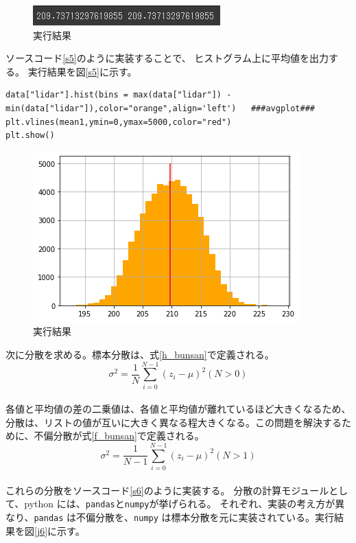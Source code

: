 \begin{figure}[htbp]
  \begin{center}
  \includegraphics[width=.5\linewidth]{img/4.png}
  \caption{実行結果}
  \label{j4}
  \end{center}
\end{figure}

ソースコード\ref{s5}\cite{robo}のように実装することで、
ヒストグラム上に平均値を出力する。
実行結果を図\ref{s5}に示す。
\begin{lstlisting}[caption=平均値の出力,label=s5]
data["lidar"].hist(bins = max(data["lidar"]) - min(data["lidar"]),color="orange",align='left')   ###avgplot###
plt.vlines(mean1,ymin=0,ymax=5000,color="red")
plt.show()
\end{lstlisting}

\begin{figure}[htbp]
  \begin{center}
  \includegraphics[width=.7\linewidth]{img/5.png}
  \caption{実行結果}
  \label{j5}
  \end{center}
\end{figure}

次に分散を求める。標本分散は、式\eqref{h_bunsan}で定義される。
\begin{equation}
  \label{h_bunsan}
  \sigma^2 = \frac{1}{N}\sum_{i=0}^{N-1} (z_i - \mu)^2 (N > 0)
\end{equation}\\
各値と平均値の差の二乗値は、各値と平均値が離れているほど大きくなるため、分散は、リストの値が互いに大きく異なる程大きくなる。この問題を解決するために、不偏分散が式\eqref{f_bunsan}で定義される。
\begin{equation}
  \label{f_bunsan}
  \sigma^2 = \frac{1}{N-1}\sum_{i=0}^{N-1}(z_i - \mu)^2 (N>1)
\end{equation}\\
これらの分散をソースコード\ref{s6}\cite{robo}のように実装する。
分散の計算モジュールとして、python には、\verb|pandas|と\verb|numpy|が挙げられる。
それぞれ、実装の考え方が異なり、\verb|pandas| は不偏分散を、\verb|numpy| は標本分散を元に実装されている。実行結果を図\ref{j6}に示す。

